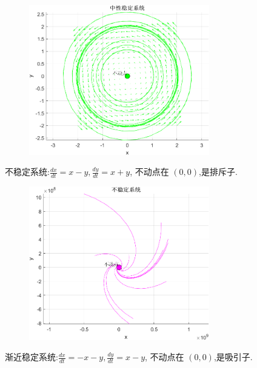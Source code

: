 \begin{figure}[H]
    \centering
    \includegraphics[width=0.7\textwidth]{Img/fix4.png}
    \label{fig:neutral_stable}
\end{figure}
不稳定系统:$\frac{dx}{dt}=x-y,\frac{dy}{dt}=x+y$, 不动点在 $(0, 0)$,是排斥子. 
\begin{figure}[H]
    \centering
    \includegraphics[width=0.7\textwidth]{Img/fix2.png}
    \label{fig:unstable}
\end{figure}
渐近稳定系统:$\frac{dx}{dt}=-x-y,\frac{dy}{dt}=x-y$, 不动点在 $(0, 0)$,是吸引子. 

